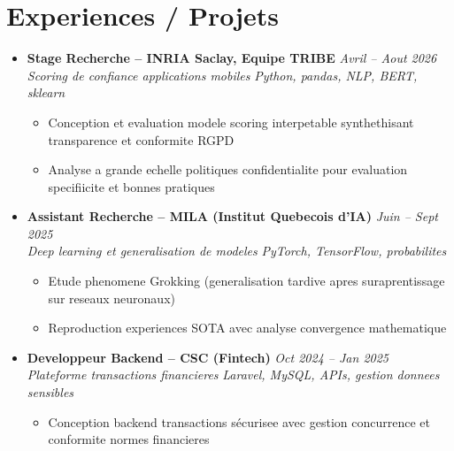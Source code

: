 \documentclass[a4paper,11pt]{article}
\begin{document}
\section{Experiences / Projets}
\begin{itemize}[leftmargin=*, label={-}]

\item \textbf{Stage Recherche -- INRIA Saclay, Equipe TRIBE} \hfill \textit{Avril -- Aout 2026} \\
\textit{Scoring de confiance applications mobiles} \hfill \textit{Python, pandas, NLP, BERT, sklearn}
\vspace{-2pt}
    \begin{itemize}[leftmargin=0.4cm, nosep, label=\tiny$\bullet$]
        \item \small{Conception et evaluation modele scoring interpetable synthethisant transparence et conformite RGPD}
        \item \small{Analyse a grande echelle politiques confidentialite pour evaluation specifiicite et bonnes pratiques}
    \end{itemize}
\vspace{3pt}

\item \textbf{Assistant Recherche -- MILA (Institut Quebecois d'IA)} \hfill \textit{Juin -- Sept 2025} \\
\textit{Deep learning et generalisation de modeles} \hfill \textit{PyTorch, TensorFlow, probabilites}
\vspace{-2pt}
    \begin{itemize}[leftmargin=0.4cm, nosep, label=\tiny$\bullet$]
        \item \small{Etude phenomene Grokking (generalisation tardive apres suraprentissage sur reseaux neuronaux)}
        \item \small{Reproduction experiences SOTA avec analyse convergence mathematique}
    \end{itemize}
\vspace{3pt}

\item \textbf{Developpeur Backend -- CSC (Fintech)} \hfill \textit{Oct 2024 -- Jan 2025} \\
\textit{Plateforme transactions financieres} \hfill \textit{Laravel, MySQL, APIs, gestion donnees sensibles}
\vspace{-2pt}
    \begin{itemize}[leftmargin=0.4cm, nosep, label=\tiny$\bullet$]
        \item \small{Conception backend transactions sécurisee avec gestion concurrence et conformite normes financieres}
    \end{itemize}
\vspace{3pt}


\end{itemize}
\end{document}
